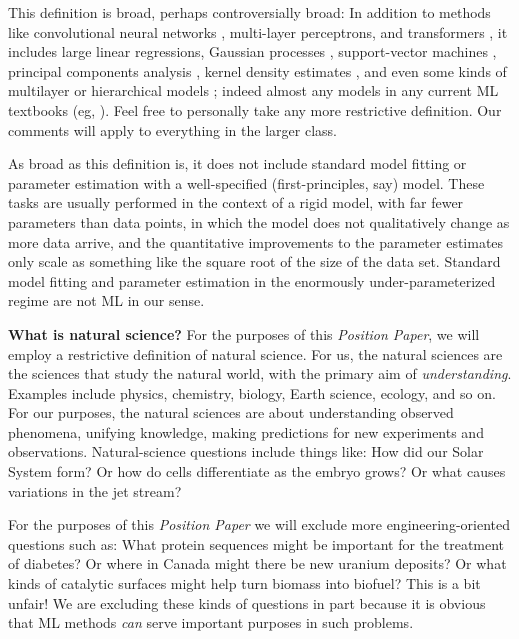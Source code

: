 \documentclass{article}
\newcommand{\documentname}{\textsl{Position Paper}}
\renewcommand{\paragraph}[1]{\noindent\par\textbf{#1}}
\begin{document}
This definition is broad, perhaps controversially broad:
In addition to methods like convolutional neural networks \cite{cnn}, multi-layer perceptrons, and transformers \cite{transformer}, it includes large linear regressions, Gaussian processes \cite{gp}, support-vector machines \cite{svm}, principal components analysis \cite{pca}, kernel density estimates \cite{kde}, and even some kinds of multilayer or hierarchical models \cite{multilevel}; indeed almost any models in any current ML textbooks (eg, \citealt{ml_book1, ml_book2}).
Feel free to personally take any more restrictive definition.
Our comments will apply to everything in the larger class.

As broad as this definition is, it does not include standard model fitting or parameter estimation with a well-specified (first-principles, say) model.
These tasks are usually performed in the context of a rigid model, with far fewer parameters than data points, in which the model does not qualitatively change as more data arrive, and the quantitative improvements to the parameter estimates only scale as something like the square root of the size of the data set.
Standard model fitting and parameter estimation in the enormously under-parameterized regime are not ML in our sense.

\paragraph{What is natural science?}
For the purposes of this \documentname, we will employ a restrictive definition of natural science.
For us, the natural sciences are the sciences that study the natural world, with the primary aim of \emph{understanding}.
Examples include physics, chemistry, biology, Earth science, ecology, and so on.
For our purposes, the natural sciences are about understanding observed phenomena, unifying knowledge, making predictions for new experiments and observations.
Natural-science questions include things like:
How did our Solar System form?
Or how do cells differentiate as the embryo grows?
Or what causes variations in the jet stream?

For the purposes of this \documentname{} we will exclude more engineering-oriented questions such as: What protein sequences might be important for the treatment of diabetes? Or where in Canada might there be new uranium deposits? Or what kinds of catalytic surfaces might help turn biomass into biofuel?
This is a bit unfair!
We are excluding these kinds of questions in part because it is obvious that ML methods \emph{can} serve important purposes in such problems.
\end{document}
